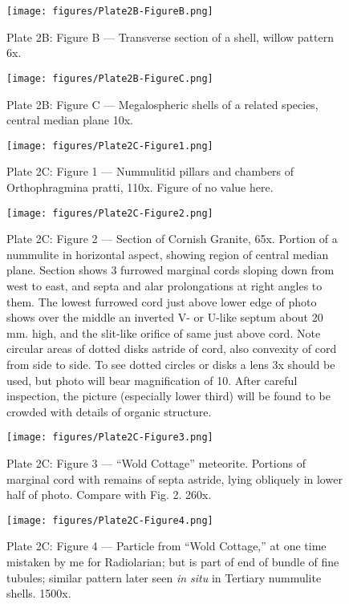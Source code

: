 \documentclass[a4paper, 12pt, oneside]{article}
\begin{document}
\clearpage
\begin{figure}[b]
\centering
\texttt{[image: figures/Plate2B-FigureB.png]}
\caption{\small Plate 2B: Figure B --- Transverse section of a shell, willow pattern 6x.}
\end{figure}
\clearpage
\begin{figure}[b]
\centering
\texttt{[image: figures/Plate2B-FigureC.png]}
\caption{\small Plate 2B: Figure C --- Megalospheric shells of a related species, central median plane 10x.}
\end{figure}
\clearpage
{}
\cfoot{\thepage}
\begin{figure}[b]
\centering
\texttt{[image: figures/Plate2C-Figure1.png]}
\caption{\small Plate 2C: Figure 1 --- Nummulitid pillars and chambers of Orthophragmina pratti, 110x. Figure of no value here.}
\end{figure}
\clearpage
\begin{figure}[b]
\centering
\texttt{[image: figures/Plate2C-Figure2.png]}
\caption{\small Plate 2C: Figure 2 --- Section of Cornish Granite, 65x. Portion of a nummulite in horizontal aspect, showing region of central median plane. Section shows 3 furrowed marginal cords sloping down from west to east, and septa and alar prolongations at right angles to them. The lowest furrowed cord just above lower edge of photo shows over the middle an inverted V- or U-like septum about 20 mm. high, and the slit-like orifice of same just above cord. Note circular areas of dotted disks astride of cord, also convexity of cord from side to side. To see dotted circles or disks a lens 3x should be used, but photo will bear magnification of 10. After careful inspection, the picture (especially lower third) will be found to be crowded with details of organic structure.}
\end{figure}
\clearpage
\begin{figure}[b]
\centering
\texttt{[image: figures/Plate2C-Figure3.png]}
\caption{\small Plate 2C: Figure 3 --- ``Wold Cottage'' meteorite. Portions of marginal cord with remains of septa astride, lying obliquely in lower half of photo. Compare with Fig. 2. 260x.}
\end{figure}
\clearpage
\begin{figure}[b]
\centering
\texttt{[image: figures/Plate2C-Figure4.png]}
\caption{\small Plate 2C: Figure 4 --- Particle from ``Wold Cottage,'' at one time mistaken by me for Radiolarian; but is part of end of bundle of fine tubules; similar pattern later seen \emph{in situ} in Tertiary nummulite shells. 1500x.}
\end{figure}
\end{document}
